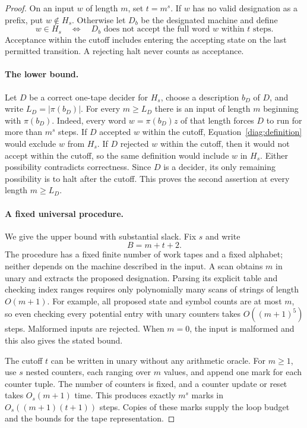 \begin{proof}
On an input $w$ of length $m$, set $t=m^s$.  If $w$ has no valid designation
as a prefix, put $w\notin H_s$.  Otherwise let $D_b$ be the designated
machine and define
\begin{equation}
\label{diag:definition}
 w\in H_s
 \quad\Longleftrightarrow\quad
 D_b\text{ does not accept the full word }w\text{ within }t\text{ steps}.
\end{equation}
Acceptance within the cutoff includes entering the accepting state on the
last permitted transition.  A rejecting halt never counts as acceptance.

\paragraph{The lower bound.}
Let $D$ be a correct one-tape decider for $H_s$, choose a description $b_D$
of $D$, and write $L_D=|\pi(b_D)|$.  For every $m\geq L_D$ there is an input
of length $m$ beginning with $\pi(b_D)$.  Indeed, every word
$w=\pi(b_D)z$ of that length forces $D$ to run for more than $m^s$ steps.
If $D$ accepted $w$ within the cutoff, Equation~\eqref{diag:definition}
would exclude $w$ from $H_s$.  If $D$ rejected $w$ within the cutoff, then
it would not accept within the cutoff, so the same definition would include
$w$ in $H_s$.  Either possibility contradicts correctness.  Since $D$ is a
decider, its only remaining possibility is to halt after the cutoff.  This
proves the second assertion at every length $m\geq L_D$.

\paragraph{A fixed universal procedure.}
We give the upper bound with substantial slack.  Fix $s$ and write
\[
                          B=m+t+2.
\]
The procedure has a fixed finite number of work tapes and a fixed alphabet;
neither depends on the machine described in the input.  A scan obtains
$m$ in unary and extracts the proposed designation.  Parsing its explicit
table and checking index ranges requires only polynomially many scans of
strings of length $O(m+1)$.  For example, all proposed state and symbol
counts are at most $m$, so even checking every potential entry with unary
counters takes $O((m+1)^5)$ steps.  Malformed inputs are rejected.  When
$m=0$, the input is malformed and this also gives the stated bound.

The cutoff $t$ can be written in unary without any arithmetic oracle.  For
$m\geq 1$, use $s$ nested counters, each ranging over $m$ values, and append
one mark for each counter tuple.  The number of counters is fixed, and a
counter update or reset takes $O_s(m+1)$ time.  This produces exactly $m^s$
marks in $O_s((m+1)(t+1))$ steps.  Copies of these marks supply the loop
budget and the bounds for the tape representation.


\end{proof}

